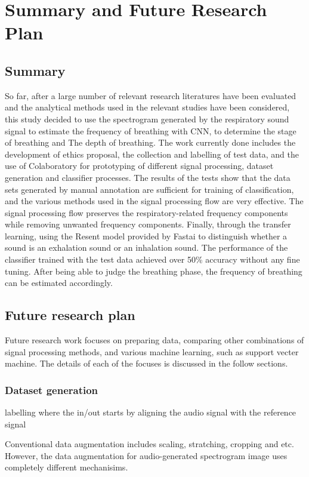 \chapter{Summary and Future Research Plan}
\section{Summary}
So far, after a large number of relevant research literatures have been evaluated and the analytical methods used in the relevant studies have been considered, this study decided to use the spectrogram generated by the respiratory sound signal to estimate the frequency of breathing with CNN, to determine the stage of breathing and The depth of breathing. The work currently done includes the development of ethics proposal, the collection and labelling of test data, and the use of Colaboratory for prototyping of different signal processing, dataset generation and classifier processes. The results of the tests show that the data sets generated by manual annotation are sufficient for training of classification, and the various methods used in the signal processing flow are very effective. The signal processing flow preserves the respiratory-related frequency components while removing unwanted frequency components. Finally, through the transfer learning, using the Resent model provided by Fastai to distinguish whether a sound is an exhalation sound or an inhalation sound. The performance of the classifier trained with the test data achieved over 50\% accuracy without any fine tuning. After being able to judge the breathing phase, the frequency of breathing can be estimated accordingly.
\section{Future research plan}
Future research work focuses on preparing data, comparing other combinations of signal processing methods, and various machine learning, such as support vecter machine. The details of each of the focuses is discussed in the follow sections.
\subsection{Dataset generation}

labelling where the in/out starts by aligning the audio signal with the reference signal

Conventional data augmentation includes scaling, stratching, cropping and etc. However, the data augmentation for audio-generated spectrogram image uses completely different mechanisims.

